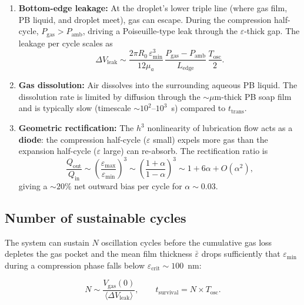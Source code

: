 \documentclass[%
 preprint,
 superscriptaddress,
 amsmath,amssymb,
 aps, prl,
]{revtex4-2}
\begin{document}
\begin{enumerate}
\item \textbf{Bottom-edge leakage:} At the droplet's lower triple line
(where gas film, PB liquid, and droplet meet), gas can escape.
During the compression half-cycle, $P_{\text{gas}} > P_{\text{amb}}$,
driving a Poiseuille-type leak through the $\varepsilon$-thick gap.
The leakage per cycle scales as
\begin{equation}
\Delta V_{\text{leak}} \sim
\frac{2\pi R_0\,\varepsilon_{\min}^3}{12\mu_a}\,
\frac{P_{\text{gas}} - P_{\text{amb}}}{L_{\text{edge}}}\,
\frac{T_{\text{osc}}}{2}.
\end{equation}

\item \textbf{Gas dissolution:} Air dissolves into the surrounding
aqueous PB liquid.  The dissolution rate is limited by diffusion
through the $\sim\mu$m-thick PB soap film and is typically slow
(timescale $\sim 10^2$--$10^3$~s) compared to $t_{\text{trans}}$.

\item \textbf{Geometric rectification:} The $h^3$ nonlinearity of
lubrication flow acts as a \textbf{diode}: the compression half-cycle
($\varepsilon$ small) expels more gas than the expansion half-cycle
($\varepsilon$ large) can re-absorb.  The rectification ratio is
\begin{equation}
\frac{Q_{\text{out}}}{Q_{\text{in}}}
\sim \left(\frac{\varepsilon_{\max}}{\varepsilon_{\min}}\right)^3
\sim \left(\frac{1+\alpha}{1-\alpha}\right)^3
\sim 1 + 6\alpha + O(\alpha^2),
\end{equation}
giving a $\sim 20\%$ net outward bias per cycle for $\alpha \sim 0.03$.
\end{enumerate}

\subsection{Number of sustainable cycles}

The system can sustain $N$ oscillation cycles before the cumulative
gas loss depletes the gas pocket and the mean film thickness $\bar{\varepsilon}$
drops sufficiently that $\varepsilon_{\min}$ during a compression phase
falls below $\varepsilon_{\text{crit}} \sim 100$~nm:

\begin{equation}
N \sim \frac{V_{\text{gas}}(0)}{\langle\Delta V_{\text{leak}}\rangle},
\qquad
t_{\text{survival}} = N \times T_{\text{osc}}.
\end{equation}
\end{document}
